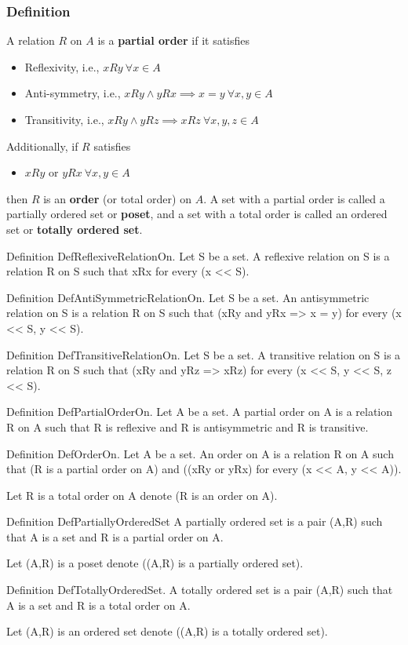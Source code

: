 \subsubsection{Definition}
\begin{true}
A relation $R$ on $A$ is a \textbf{partial order} if it satisfies
\begin{itemize}
    \item Reflexivity, i.e., $xRy \ \forall x \in A$
    \item Anti-symmetry, i.e., $xRy \land yRx \implies x = y \ \forall x,y \in A$
    \item Transitivity, i.e., $xRy \land yRz \implies xRz \ \forall x,y,z \in A$
\end{itemize}
Additionally, if $R$ satisfies
\begin{itemize}
    \item $xRy$ or $yRx \ \forall x,y \in A$
\end{itemize}
then $R$ is an \textbf{order} (or total order) on $A$. A set with a partial order is called a partially ordered set or \textbf{poset}, and a set with a total order is called an ordered set or \textbf{totally ordered set}.
\end{true}
\begin{forthel}
Definition DefReflexiveRelationOn. 
    Let S be a set.
    A reflexive relation on S is a relation R on S such that
    xRx for every (x << S).

Definition DefAntiSymmetricRelationOn. 
    Let S be a set.
    An antisymmetric relation on S is a relation R on S such that
    (xRy and yRx => x = y) for every (x << S, y << S).

Definition DefTransitiveRelationOn.
    Let S be a set.
    A transitive relation on S is a relation R on S such that
    (xRy and yRz => xRz) for every (x << S, y << S, z << S).

Definition DefPartialOrderOn.
    Let A be a set.
    A partial order on A is a relation R on A such that
    R is reflexive and R is antisymmetric and R is transitive.

Definition DefOrderOn.
    Let A be a set.
    An order on A is a relation R on A such that
    (R is a partial order on A) and ((xRy or yRx) for every (x << A, y << A)).

Let R is a total order on A denote (R is an order on A).

Definition DefPartiallyOrderedSet
    A partially ordered set is a pair (A,R) such that A is a set and R is a partial order on A.

Let (A,R) is a poset denote ((A,R) is a partially ordered set).

Definition DefTotallyOrderedSet.
    A totally ordered set is a pair (A,R) such that A is a set and R is a total order on A.

Let (A,R) is an ordered set denote ((A,R) is a totally ordered set).
\end{forthel}

